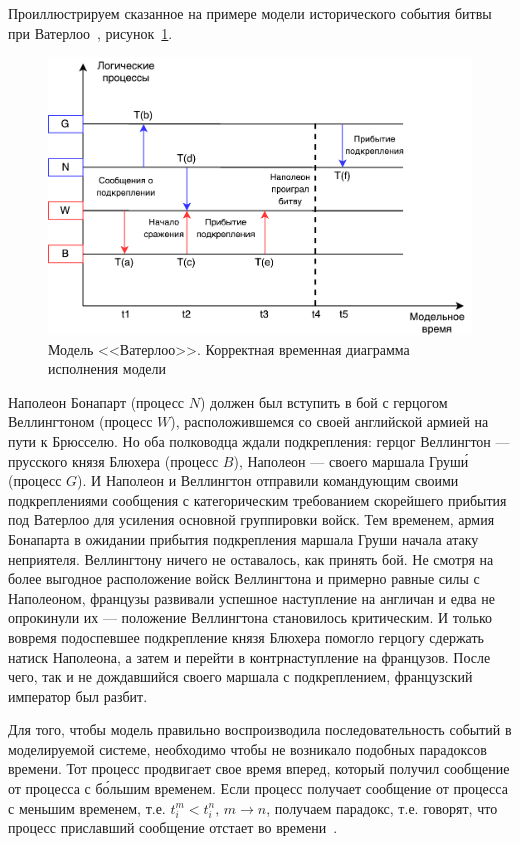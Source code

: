 Проиллюстрируем сказанное на примере модели исторического события битвы при Ватерлоо~\cite{napoleon}, рисунок~\ref{fig:Корректная временная диаграмма исполнения модели}.

\begin{figure}[!ht]
\centering
\includegraphics[scale=1]{images/waterloo.pdf}
\caption{Модель <<Ватерлоо>>. Корректная временная диаграмма исполнения модели}
\label{fig:Корректная временная диаграмма исполнения модели}
\end{figure}

Наполеон Бонапарт (процесс $N$) должен был вступить в бой с герцогом Веллингтоном (процесс $W$), расположившемся со своей английской армией на пути к Брюсселю. Но оба полководца ждали подкрепления: герцог Веллингтон --- прусского князя Блюхера (процесс $B$), Наполеон --- своего маршала Груш\'и (процесс $G$). И Наполеон и Веллингтон отправили командующим своими подкреплениями сообщения с категорическим требованием скорейшего прибытия под Ватерлоо для усиления основной группировки войск. Тем временем, армия Бонапарта в ожидании прибытия подкрепления маршала Груши начала атаку неприятеля. Веллингтону ничего не оставалось, как принять бой. Не смотря на более выгодное расположение войск Веллингтона и примерно равные силы с Наполеоном, французы развивали успешное наступление на англичан и едва не опрокинули их --- положение Веллингтона становилось критическим. И только вовремя подоспевшее подкрепление князя Блюхера помогло герцогу сдержать натиск Наполеона, а затем и перейти в контрнаступление на французов. После чего, так и не дождавшийся своего маршала с подкреплением, французский император был разбит.

Для того, чтобы модель правильно воспроизводила последовательность событий в моделируемой системе, необходимо чтобы не возникало подобных парадоксов времени.
Тот процесс продвигает свое время вперед, который получил сообщение от процесса с б\'ольшим временем. Если процесс получает сообщение от процесса с меньшим временем, т.е. $t_i^m<t_i^n, \, m \to n$, получаем парадокс, т.е. говорят, что процесс приславший сообщение  отстает во времени~\cite{okol}.

